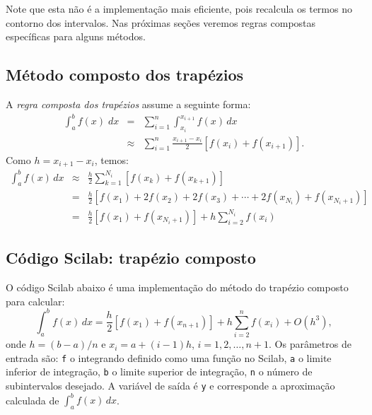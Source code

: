 Note que esta não é a implementação mais eficiente, pois recalcula os termos no contorno dos intervalos. Nas próximas seções veremos regras compostas específicas para alguns métodos.
\fi

\subsection{Método composto dos trapézios}
A \emph{regra composta dos trapézios} assume a seguinte forma:
\begin{eqnarray}
  \int_{a}^b f(x)\;dx &=& \sum_{i=1}^{n} \int_{x_i}^{x_{i+1}}f(x)\,dx \\
  &\approx& \sum_{i=1}^{n} \frac{x_{i+1}-x_i}{2}\left[f(x_i)+f(x_{i+1})\right].
\end{eqnarray}
Como $h = x_{i+1} - x_i$, temos:
\begin{eqnarray}
\int_{a}^b f(x)\,dx &\approx& \frac{h}{2}\sum_{k=1}^{N_i}\left[f(x_k)+f(x_{k+1})\right]\\
&=& \frac{h}{2}\left[f(x_1)+2f(x_2)+2f(x_3)+\cdots + 2f(x_{N_i})+f(x_{N_i+1})\right]\\
&=& \frac{h}{2}\left[f(x_1) + f(x_{N_i+1})\right] + h\sum_{i=2}^{N_i} f(x_i)
\end{eqnarray}

\ifisscilab
\subsection{Código Scilab: trapézio composto}
O código Scilab abaixo é uma implementação do método do trapézio composto para calcular:
\begin{equation}
  \int_a^b f(x)\,dx = \frac{h}{2}\left[f(x_1) + f(x_{n+1})\right] + h\sum_{i=2}^n f(x_i) + O(h^3),
\end{equation}
onde $h = (b-a)/n$ e $x_i = a + (i-1)h$, $i=1,2,\dotsc,n+1$. Os parâmetros de entrada são: \verb+f+ o integrando definido como uma função no Scilab, \verb+a+ o limite inferior de integração, \verb+b+ o limite superior de integração, \verb+n+ o número de subintervalos desejado. A variável de saída é \verb+y+ e corresponde a aproximação calculada de $\int_a^b f(x)\, dx$.


\fi
\ifisoctave
